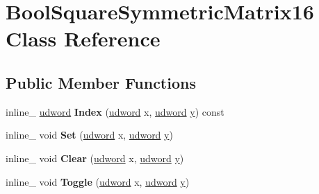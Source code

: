 \hypertarget{class_bool_square_symmetric_matrix16}{\section{Bool\+Square\+Symmetric\+Matrix16 Class Reference}
\label{class_bool_square_symmetric_matrix16}
}
\subsection*{Public Member Functions}
\begin{DoxyCompactItemize}
\item 
\hypertarget{class_bool_square_symmetric_matrix16_ac75abd51a9a77f1a18b3de92206f82e5}{inline\+\_\+ \hyperlink{_ice_types_8h_a44c6f1920ba5551225fb534f9d1a1733}{udword} {\bfseries Index} (\hyperlink{_ice_types_8h_a44c6f1920ba5551225fb534f9d1a1733}{udword} x, \hyperlink{_ice_types_8h_a44c6f1920ba5551225fb534f9d1a1733}{udword} \hyperlink{_ice_utils_8h_aa7ffaed69623192258fb8679569ff9ba}{y}) const }\label{class_bool_square_symmetric_matrix16_ac75abd51a9a77f1a18b3de92206f82e5}

\item 
\hypertarget{class_bool_square_symmetric_matrix16_a7ec3f3fd65866e0a89bde06bcebcf43d}{inline\+\_\+ void {\bfseries Set} (\hyperlink{_ice_types_8h_a44c6f1920ba5551225fb534f9d1a1733}{udword} x, \hyperlink{_ice_types_8h_a44c6f1920ba5551225fb534f9d1a1733}{udword} \hyperlink{_ice_utils_8h_aa7ffaed69623192258fb8679569ff9ba}{y})}\label{class_bool_square_symmetric_matrix16_a7ec3f3fd65866e0a89bde06bcebcf43d}

\item 
\hypertarget{class_bool_square_symmetric_matrix16_a5aa44b5ea8e68e91e6e68a0a6308250a}{inline\+\_\+ void {\bfseries Clear} (\hyperlink{_ice_types_8h_a44c6f1920ba5551225fb534f9d1a1733}{udword} x, \hyperlink{_ice_types_8h_a44c6f1920ba5551225fb534f9d1a1733}{udword} \hyperlink{_ice_utils_8h_aa7ffaed69623192258fb8679569ff9ba}{y})}\label{class_bool_square_symmetric_matrix16_a5aa44b5ea8e68e91e6e68a0a6308250a}

\item 
\hypertarget{class_bool_square_symmetric_matrix16_a7495a897781a8f60f827bcc6aca8c9e6}{inline\+\_\+ void {\bfseries Toggle} (\hyperlink{_ice_types_8h_a44c6f1920ba5551225fb534f9d1a1733}{udword} x, \hyperlink{_ice_types_8h_a44c6f1920ba5551225fb534f9d1a1733}{udword} \hyperlink{_ice_utils_8h_aa7ffaed69623192258fb8679569ff9ba}{y})}\label{class_bool_square_symmetric_matrix16_a7495a897781a8f60f827bcc6aca8c9e6}


\end{DoxyCompactItemize}
